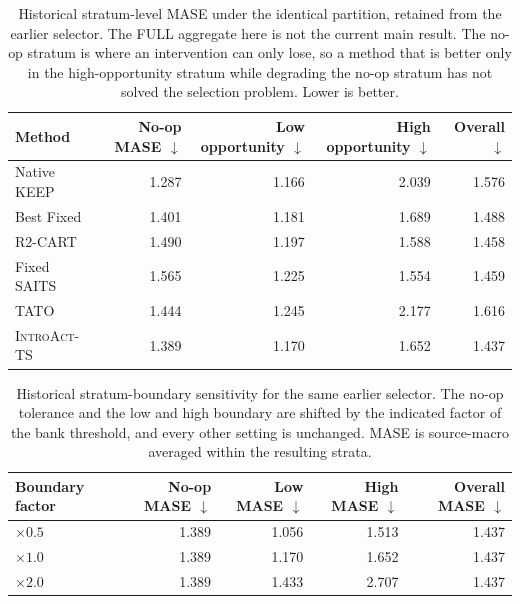 \documentclass{article}
\newcommand{\introact}{\textsc{IntroAct-TS}}
\begin{document}
\begin{table}[tp]
  \caption{Historical stratum-level MASE under the identical partition, retained from the earlier selector. The FULL aggregate here is not the current main result. The no-op stratum is where an
  intervention can only lose, so a method that is better only in the high-opportunity stratum
  while degrading the no-op stratum has not solved the selection problem. Lower is better.}
  \label{tab:app-opportunity}
  \centering
  \small
  \setlength{\tabcolsep}{4pt}
\begin{tabular*}{\textwidth}{@{\extracolsep{\fill}}lrrrr@{}}
    \toprule
    Method & No-op MASE $\downarrow$ & Low opportunity $\downarrow$ & High opportunity $\downarrow$ & Overall $\downarrow$ \\
    \midrule
    Native KEEP        & 1.287    & 1.166    & 2.039    & 1.576 \\
    Best Fixed         & 1.401      & 1.181      & 1.689      & 1.488 \\
    R2-CART            & 1.490      & 1.197      & 1.588      & 1.458 \\
    Fixed SAITS           & 1.565      & 1.225      & 1.554      & 1.459 \\
    TATO               & 1.444    & 1.245    & 2.177    & 1.616 \\
    \midrule
    \rowcolor{bestgray}\introact{} & 1.389 & 1.170 & 1.652 & 1.437 \\
    \bottomrule
  \end{tabular*}
\end{table}

\begin{table}[tp]
  \caption{Historical stratum-boundary sensitivity for the same earlier selector. The no-op tolerance and the low and high boundary are
  shifted by the indicated factor of the bank threshold, and every other setting is unchanged.
  MASE is source-macro averaged within the resulting strata.}
  \label{tab:app-opp-sens}
  \centering
  \small
  \setlength{\tabcolsep}{4pt}
\begin{tabular*}{\textwidth}{@{\extracolsep{\fill}}lrrrr@{}}
    \toprule
    Boundary factor & No-op MASE $\downarrow$ & Low MASE $\downarrow$ & High MASE $\downarrow$ & Overall MASE $\downarrow$ \\
    \midrule
    $\times 0.5$ & 1.389  & 1.056  & 1.513  & 1.437 \\
    $\times 1.0$ & 1.389   & 1.170   & 1.652   & 1.437 \\
    $\times 2.0$ & 1.389   & 1.433   & 2.707   & 1.437 \\
    \bottomrule
  \end{tabular*}
\end{table}
\end{document}
